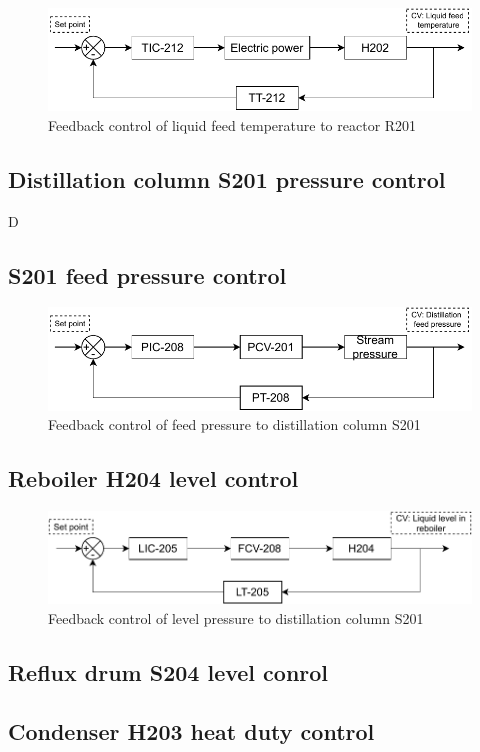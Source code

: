     \begin{figure}[H]
        \centering
        \includegraphics[width=0.9\linewidth]{chapters/4-operation-control/4-Figures/H202-TC.pdf}
        \caption{Feedback control of liquid feed temperature to reactor R201}
        \label{fig:H202-TC}
    \end{figure} 

\subsection{Distillation column S201 pressure control}

D

\subsection{S201 feed pressure control}

    \begin{figure}[H]
        \centering
        \includegraphics[width=0.9\linewidth]{chapters/4-operation-control/4-Figures/PCV201-PC.pdf}
        \caption{Feedback control of feed pressure to distillation column S201}
        \label{fig:PCV201-PC}
    \end{figure}     

\subsection{Reboiler H204 level control}

    \begin{figure}[H]
        \centering
        \includegraphics[width=0.9\linewidth]{chapters/4-operation-control/4-Figures/H204-LC.pdf}
        \caption{Feedback control of level pressure to distillation column S201}
        \label{fig:PCV201-PC}
    \end{figure}  

\subsection{Reflux drum S204 level conrol}

\subsection{Condenser H203 heat duty control}

